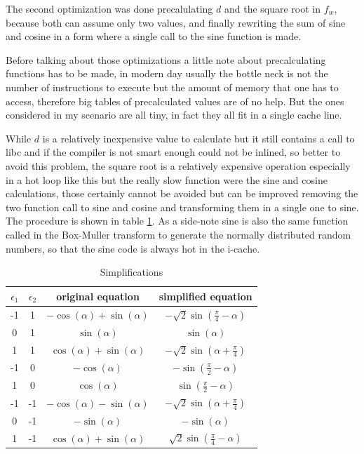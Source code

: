 \documentclass[Lau]{sapthesis} %
\begin{document}
The second optimization was done precalulating $d$ and the square root in $f_w$,
because both can assume only two values, and finally rewriting the sum of sine
and cosine in a form where a single call to the sine function is made.

Before talking about those optimizations a little note about precalculating
functions has to be made, in modern day usually the bottle neck is not the
number of instructions to execute but the amount of memory that one has to
access, therefore big tables of precalculated values are of no help.  But the
ones considered in my scenario are all tiny, in fact they all fit in a single
cache line.

While $d$ is a relatively inexpensive value to calculate but it still contains a
call to libc and if the compiler is not smart enough could not be inlined, so
better to avoid this problem, the square root is a relatively expensive
operation especially in a hot loop like this but the really slow function were
the sine and cosine calculations, those certainly cannot be avoided but can be
improved removing the two function call to sine and cosine and transforming them
in a single one to sine. The procedure is shown in table
\ref{tab:simplifications}. As a side-note sine is also the same function called
in the Box-Muller transform to generate the normally distributed random numbers,
so that the sine code is always hot in the i-cache.

\begin{table}
\centering
\begin{tabular}{c c | c | c}
$\epsilon_1$ & $\epsilon_2$ & original equation & simplified equation\\
\hline
-1 & 1 & $-\cos(\alpha)+\sin(\alpha)$ & $-\sqrt{2}\sin(\frac{\pi}{4}-\alpha)$\\
0 & 1 & $\sin(\alpha)$ & $\sin(\alpha)$\\
1 & 1 & $\cos(\alpha) + \sin(\alpha)$ & $-\sqrt{2}\sin(\alpha+\frac{\pi}{4})$\\
-1 & 0 & $-\cos(\alpha)$ & $-\sin(\frac{\pi}{2}-\alpha)$\\
1 & 0 & $\cos(\alpha)$ & $\sin(\frac{\pi}{2}-\alpha)$\\
-1 & -1 & $-\cos(\alpha)-\sin(\alpha)$ & $-\sqrt{2}\sin(\alpha+\frac{\pi}{4})$\\
0 & -1 & $-\sin(\alpha)$ & $-\sin(\alpha)$\\
1 & -1 & $\cos(\alpha) + \sin(\alpha)$ & $\sqrt{2}\sin(\frac{\pi}{4}-\alpha)$\\
\end{tabular}
\caption{Simplifications}
\label{tab:simplifications}
\end{table}
\end{document}
